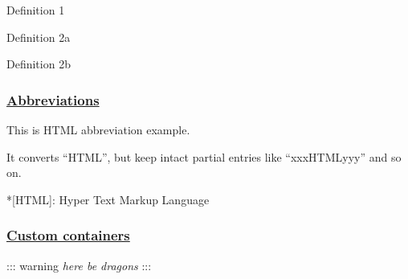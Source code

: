 \documentclass[]{article}
\providecommand{\tightlist}{%
  \setlength{\itemsep}{0pt}\setlength{\parskip}{0pt}}
\begin{document}
\begin{description}
\tightlist
\item[Term 1]
Definition 1
\item[Term 2]
Definition 2a

Definition 2b
\end{description}

\subsubsection{\texorpdfstring{\href{https://github.com/markdown-it/markdown-it-abbr}{Abbreviations}}{Abbreviations}}\label{abbreviations}

This is HTML abbreviation example.

It converts ``HTML'', but keep intact partial entries like
``xxxHTMLyyy'' and so on.

*{[}HTML{]}: Hyper Text Markup Language

\subsubsection{\texorpdfstring{\href{https://github.com/markdown-it/markdown-it-container}{Custom
containers}}{Custom containers}}\label{custom-containers}

::: warning \emph{here be dragons} :::
\end{document}
